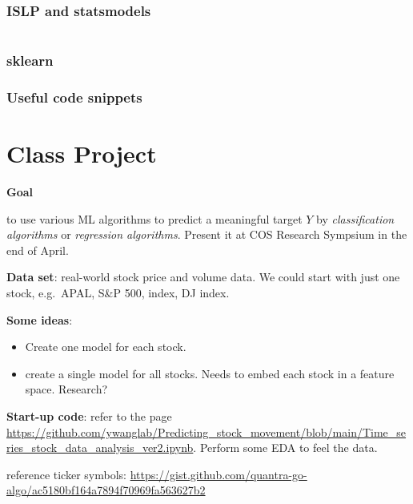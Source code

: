 \documentclass[
  letterpaper,
  DIV=11,
  numbers=noendperiod]{scrreprt}
\providecommand{\tightlist}{%
  \setlength{\itemsep}{0pt}\setlength{\parskip}{0pt}}\usepackage{longtable,booktabs,array}
\begin{document}
\begin{verbatim}

\end{verbatim}

\subsection{ISLP and statsmodels}\label{islp-and-statsmodels-8}

\begin{verbatim}
\end{verbatim}

\subsection{sklearn}\label{sklearn-8}

\subsection{Useful code snippets}\label{useful-code-snippets-5}


\chapter{Class Project}\label{class-project}

\textbf{Goal}

to use various ML algorithms to predict a meaningful target \(Y\) by
\emph{classification algorithms} or \emph{regression algorithms}.
Present it at COS Research Sympsium in the end of April.

\textbf{Data set}: real-world stock price and volume data. We could
start with just one stock, e.g.~APAL, S\&P 500, index, DJ index.

\textbf{Some ideas}:

\begin{itemize}
\tightlist
\item
  Create one model for each stock.
\item
  create a single model for all stocks. Needs to embed each stock in a
  feature space. Research?
\end{itemize}

\textbf{Start-up code}: refer to the page
\url{https://github.com/ywanglab/Predicting_stock_movement/blob/main/Time_series_stock_data_analysis_ver2.ipynb}.
Perform some EDA to feel the data.

reference ticker symbols:
\url{https://gist.github.com/quantra-go-algo/ac5180bf164a7894f70969fa563627b2}
\end{document}
